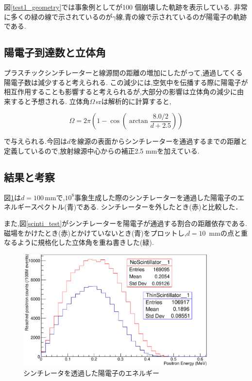 図\ref{test1_geometry}では事象例としてが100 個崩壊した軌跡を表示している.
非常に多くの緑の線で示されているのが$\gamma$線,青の線で示されているのが陽電子の軌跡である.

\subsection{陽電子到達数と立体角}

プラスチックシンチレーターと線源間の距離の増加にしたがって,通過してくる陽電子数は減少すると考えられる.
この減少には,空気中を伝播する際に陽電子が相互作用することも影響すると考えられるが,大部分の影響は立体角の減少に由来すると予想される.
立体角$\Omega$\,srは解析的に計算すると,

\begin{equation}
	\nonumber
	\Omega = 2\pi \left( 1-\cos\left(\arctan\frac{8.0/2}{d+2.5}\right)\right)
\end{equation}

で与えられる.今回は$d$を線源の表面からシンチレーターを通過するまでの距離と定義しているので,放射線源中心からの補正2.5 mmを加えている.

\subsection{結果と考察}

図\ref{test1}は$d=100$\,mmで,$10^8$事象生成した際のシンチレーターを通過した陽電子のエネルギースペクトル(青)である. シンチレーターを外したとき(赤)と比較した．

また,図\ref{scinti_test}がシンチレーターを陽電子が通過する割合の距離依存である.磁場をかけたとき(赤)とかけていないとき(青)をプロットし,$d=10$\, mmの点と重なるように規格化した立体角を重ね書きした(緑).


\begin{figure}[htbp]
	\centering
		\includegraphics[width=10cm]{fig/test1.pdf}
	\caption{シンチレータを透過した陽電子のエネルギー}
	\label{test1}
\end{figure}


